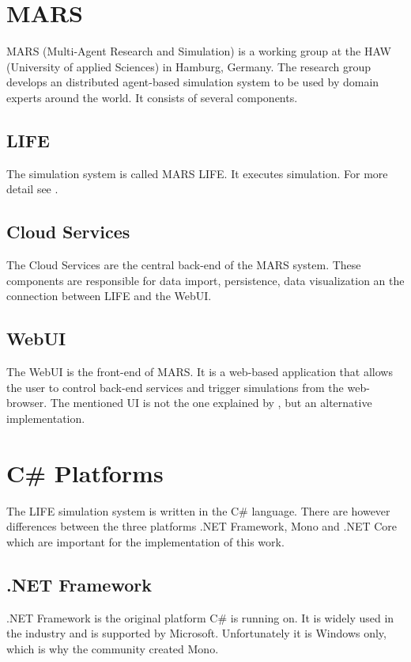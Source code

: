 \section{MARS}
MARS (Multi-Agent Research and Simulation) is a working group at the HAW (University of applied Sciences) in Hamburg, Germany. The research group develops an distributed agent-based simulation system \citep{Wooldridge2009} to be used by domain experts around the world. It consists of several components.


\subsection{LIFE}
The simulation system is called MARS LIFE. It executes simulation. For more detail see \cite{Huning2016}.


\subsection{Cloud Services}
The Cloud Services are the central back-end of the MARS system. These components are responsible for data import, persistence, data visualization an the connection between LIFE and the WebUI.


\subsection{WebUI}
The WebUI is the front-end of MARS. It is a web-based application that allows the user to control back-end services and trigger simulations from the web-browser. The mentioned UI is not the one explained by \cite{Karsten2017}, but an alternative implementation.



\section{C\# Platforms}
The LIFE simulation system is written in the C\# language. There are however differences between the three platforms .NET Framework, Mono and .NET Core which are important for the implementation of this work.


\subsection{.NET Framework}
.NET Framework is the original platform C\# is running on. It is widely used in the industry and is supported by Microsoft. Unfortunately it is Windows only, which is why the community created Mono.

